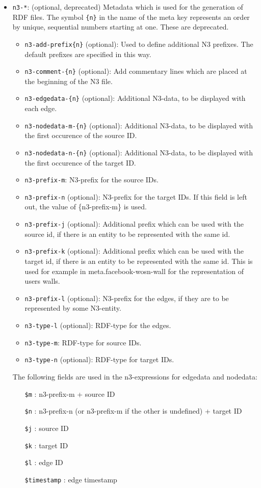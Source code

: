\documentclass{article}
\begin{document}
\begin{itemize}
\item \texttt{n3-*}: (optional, deprecated) Metadata which is used for the
  generation of RDF files. The symbol \texttt{\{n\}} in the name
  of the meta key represents an order by unique, sequential
  numbers starting at one.  These are deprecated. 
  \begin{itemize}
  \item \texttt{n3-add-prefix\{n\}} (optional):
    Used to define additional N3 prefixes. The
    default prefixes are specified in this way.
  \item \texttt{n3-comment-\{n\}} (optional): Add
    commentary lines which are placed at the
    beginning of the N3 file.
  \item \texttt{n3-edgedata-\{n\}} (optional):
    Additional N3-data, to be displayed with each
    edge.
  \item \texttt{n3-nodedata-m-\{n\}} (optional):
    Additional N3-data, to be displayed with the
    first occurence of the source ID.
  \item \texttt{n3-nodedata-n-\{n\}} (optional):
    Additional N3-data, to be displayed with the
    first occurence of the target ID.
  \item \texttt{n3-prefix-m}: N3-prefix for the
    source IDs.
  \item \texttt{n3-prefix-n} (optional): N3-prefix
    for the target IDs. If this field is left out,
    the value of \{n3-prefix-m\} is used.
  \item \texttt{n3-prefix-j} (optional):
    Additional prefix which can be used with the
    source id, if there is an entity to be
    represented with the same id.
  \item \texttt{n3-prefix-k} (optional):
    Additional prefix which can be used with the
    target id, if there is an entity to be
    represented with the same id. This is used for
    example in meta.facebook-wosn-wall for the
    representation of users walls.
  \item \texttt{n3-prefix-l} (optional): N3-prefix
    for the edges, if they are to be represented
    by some N3-entity.
  \item \texttt{n3-type-l} (optional): RDF-type
    for the edges.
  \item \texttt{n3-type-m}: RDF-type for source
    IDs.
  \item \texttt{n3-type-n} (optional): RDF-type
    for target IDs.
  \end{itemize}
  The following fields are used in the n3-expressions for
  edgedata and nodedata:
  \begin{itemize}
  \item[\texttt{\$m}]: n3-prefix-m + source ID
  \item[\texttt{\$n}]: n3-prefix-n (or n3-prefix-m
    if the other is undefined) + target ID
  \item[\texttt{\$j}]: source ID
  \item[\texttt{\$k}]: target ID
  \item[\texttt{\$l}]: edge ID
  \item[\texttt{\$timestamp}]: edge timestamp
  \end{itemize}
\end{itemize}
\end{document}
